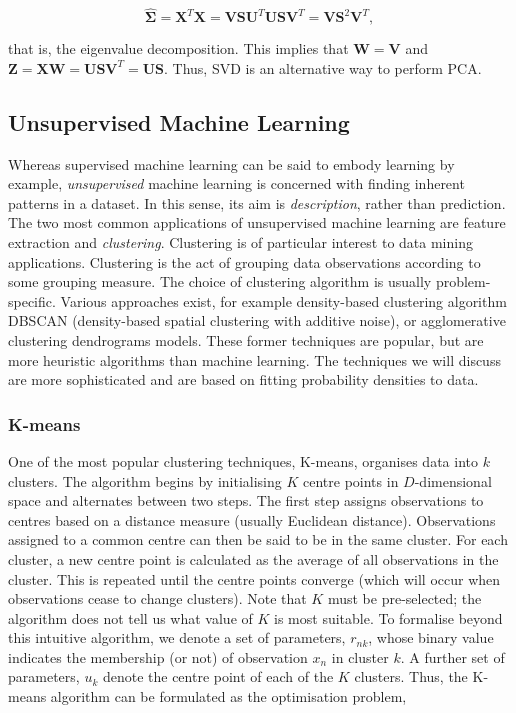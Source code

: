 \documentclass[11pt]{amsart}
\begin{document}
$$\hat{\boldsymbol\Sigma} = \mathbf{X}^T\mathbf{X} = \mathbf{V}\mathbf{S}\mathbf{U}^T\mathbf{U}\mathbf{S}\mathbf{V}^T =  \mathbf{V}\mathbf{S}^2\mathbf{V}^T,$$

that is, the eigenvalue decomposition. This implies that $\mathbf{W} = \mathbf{V}$ and $\mathbf{Z} = \mathbf{X}\mathbf{W} = \mathbf{U}\mathbf{S}\mathbf{V}^T = \mathbf{U}\mathbf{S}$. Thus, SVD is an alternative way to perform PCA.

\subsection{Unsupervised Machine Learning}

Whereas supervised machine learning can be said to embody learning by example, \emph{unsupervised} machine learning is concerned with finding inherent patterns in a dataset. In this sense, its aim is \emph{description}, rather than prediction. The two most common applications of unsupervised machine learning are feature extraction and \emph{clustering}. Clustering is of particular interest to data mining applications. Clustering is the act of grouping data observations according to some grouping measure. The choice of clustering algorithm is usually problem-specific. Various approaches exist, for example density-based clustering algorithm DBSCAN (density-based spatial clustering with additive noise), or agglomerative clustering dendrograms models. These former techniques are popular, but are more heuristic algorithms than machine learning. The techniques we will discuss are more sophisticated and are based on fitting probability densities to data.

\subsubsection{K-means}

One of the most popular clustering techniques, K-means, organises data into $k$ clusters. The algorithm begins by initialising $K$ centre points in $D$-dimensional space and alternates between two steps. The first step assigns observations to centres based on a distance measure (usually Euclidean distance). Observations assigned to a common centre can then be said to be in the same cluster. For each cluster, a new centre point is calculated as the average of all observations in the cluster. This is repeated until the centre points converge (which will occur when observations cease to change clusters). Note that $K$ must be pre-selected; the algorithm does not tell us what value of $K$ is most suitable. To formalise beyond this intuitive algorithm, we denote a set of parameters, $r_{nk}$, whose binary value indicates the membership (or not) of observation $x_n$ in cluster $k$. A further set of parameters, $u_k$ denote the centre point of each of the $K$ clusters. Thus, the K-means algorithm can be formulated as the optimisation problem,
\end{document}
